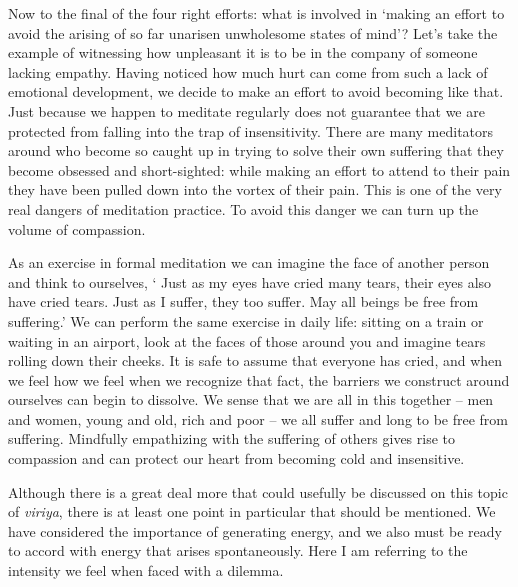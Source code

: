 Now to the final of the four right efforts: what is involved in `making
an effort to avoid the arising of so far unarisen unwholesome states of
mind'? Let's take the example of witnessing how unpleasant it is to be
in the company of someone lacking empathy. Having noticed how much hurt
can come from such a lack of emotional development, we decide to make an
effort to avoid becoming like that. Just because we happen to meditate
regularly does not guarantee that we are protected from falling into the
trap of insensitivity. There are many meditators around who become so
caught up in trying to solve their own suffering that they become
obsessed and short-sighted: while making an effort to attend to their
pain they have been pulled down into the vortex of their pain. This is
one of the very real dangers of meditation practice. To avoid this
danger we can turn up the volume of compassion.

As an exercise in formal meditation we can imagine the face of another
person and think to ourselves, ` Just as my eyes have cried many tears,
their eyes also have cried tears. Just as I suffer, they too suffer. May
all beings be free from suffering.' We can perform the same exercise in
daily life: sitting on a train or waiting in an airport, look at the
faces of those around you and imagine tears rolling down their cheeks.
It is safe to assume that everyone has cried, and when we feel how we
feel when we recognize that fact, the barriers we construct around
ourselves can begin to dissolve. We sense that we are all in this
together -- men and women, young and old, rich and poor -- we all suffer
and long to be free from suffering. Mindfully empathizing with the
suffering of others gives rise to compassion and can protect our heart
from becoming cold and insensitive.

Although there is a great deal more that could usefully be discussed on
this topic of \emph{viriya}, there is at least one point in particular
that should be mentioned. We have considered the importance of
generating energy, and we also must be ready to accord with energy that
arises spontaneously. Here I am referring to the intensity we feel when
faced with a dilemma.

